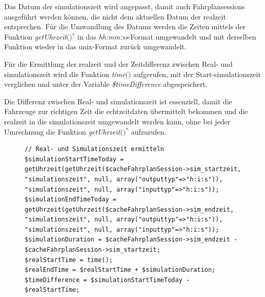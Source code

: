 Das Datum der \Gls{simulationszeit} wird angepasst, damit auch Fahrplansessions ausgeführt werden können, die nicht dem aktuellen Datum der \Gls{realzeit} entsprechen. Für die Umwandlung des Datums werden die Zeiten mittels der Funktion \textit{getUhrzeit$($$)$}$^\ast$ in das \textit{hh:mm:ss}-Format umgewandelt und mit derselben Funktion wieder in das \Gls{unix}-Format zurück umgewandelt.

Für die Ermittlung der \Gls{realzeit} und der Zeitdifferenz zwischen Real- und \Gls{simulationszeit} wird die Funktion \textit{time$($$)$} aufgerufen, mit der Start-\Gls{simulationszeit} verglichen und unter der Variable \textit{\$timeDifference} abgespeichert.

Die Differenz zwischen Real- und \Gls{simulationszeit} ist es­sen­zi­ell, damit die Fahrzeuge zur richtigen Zeit die \Gls{echtzeitdaten} übermittelt bekommen und die \Gls{realzeit} in die \Gls{simulationszeit} umgewandelt werden kann, ohne bei jeder Umrechnung die Funktion \textit{getUhrzeit$($$)$}$^\ast$ aufzurufen.
\begin{figure}
\begin{lstlisting}[caption={Ermittlung der Real- und Simulationszeit \textit{(fahrzeug\-steu\-e\-rung.php)}},captionpos=b,label={lst:readTime}]
// Real- und Simulationszeit ermitteln
$simulationStartTimeToday = getUhrzeit(getUhrzeit($cacheFahrplanSession->sim_startzeit, "simulationszeit", null, array("outputtyp"=>"h:i:s")), "simulationszeit", null, array("inputtyp"=>"h:i:s"));
$simulationEndTimeToday = getUhrzeit(getUhrzeit($cacheFahrplanSession->sim_endzeit, "simulationszeit", null, array("outputtyp"=>"h:i:s")), "simulationszeit", null, array("inputtyp"=>"h:i:s"));
$simulationDuration = $cacheFahrplanSession->sim_endzeit - $cacheFahrplanSession->sim_startzeit;
$realStartTime = time();
$realEndTime = $realStartTime + $simulationDuration;
$timeDifference = $simulationStartTimeToday - $realStartTime;
\end{lstlisting}
\end{figure}
